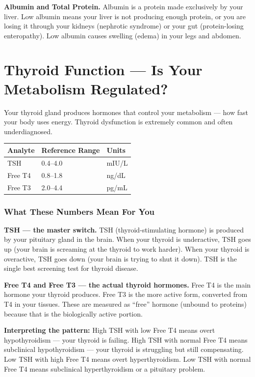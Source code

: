 \textbf{Albumin and Total Protein.} Albumin is a protein made exclusively by your liver. Low albumin means your liver is not producing enough protein, or you are losing it through your kidneys (nephrotic syndrome) or your gut (protein-losing enteropathy). Low albumin causes swelling (edema) in your legs and abdomen.

\clearpage
\section{Thyroid Function --- Is Your Metabolism Regulated?}

Your thyroid gland produces hormones that control your metabolism --- how fast your body uses energy. Thyroid dysfunction is extremely common and often underdiagnosed.

\begin{longtable}{@{}lll@{}}
\toprule
\textbf{Analyte} & \textbf{Reference Range} & \textbf{Units} \\
\midrule
TSH & 0.4--4.0 & mIU/L \\
Free T4 & 0.8--1.8 & ng/dL \\
Free T3 & 2.0--4.4 & pg/mL \\
\bottomrule
\end{longtable}

\subsubsection{What These Numbers Mean For You}

\textbf{TSH --- the master switch.} TSH (thyroid-stimulating hormone) is produced by your pituitary gland in the brain. When your thyroid is underactive, TSH goes up (your brain is screaming at the thyroid to work harder). When your thyroid is overactive, TSH goes down (your brain is trying to shut it down). TSH is the single best screening test for thyroid disease.

\textbf{Free T4 and Free T3 --- the actual thyroid hormones.} Free T4 is the main hormone your thyroid produces. Free T3 is the more active form, converted from T4 in your tissues. These are measured as ``free'' hormone (unbound to proteins) because that is the biologically active portion.

\textbf{Interpreting the pattern:} High TSH with low Free T4 means overt hypothyroidism --- your thyroid is failing. High TSH with normal Free T4 means subclinical hypothyroidism --- your thyroid is struggling but still compensating. Low TSH with high Free T4 means overt hyperthyroidism. Low TSH with normal Free T4 means subclinical hyperthyroidism or a pituitary problem.

